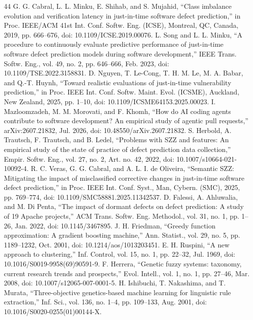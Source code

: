 \begin{thebibliography}{44}
 G. G. Cabral, L. L. Minku, E. Shihab, and S. Mujahid, ``Class imbalance evolution and verification latency in just-in-time software defect prediction,'' in Proc. IEEE/ACM 41st Int. Conf. Softw. Eng. (ICSE), Montreal, QC, Canada, 2019, pp. 666--676, doi: \mbox{10.1109/ICSE.2019.00076}.
 L. Song and L. L. Minku, ``A procedure to continuously evaluate predictive performance of just-in-time software defect prediction models during software development,'' IEEE Trans. Softw. Eng., vol. 49, no. 2, pp. 646--666, Feb. 2023, doi: \mbox{10.1109/TSE.2022.3158831}.
 D. Nguyen, T. Le-Cong, T. H. M. Le, M. A. Babar, and Q.-T. Huynh, ``Toward realistic evaluations of just-in-time vulnerability prediction,'' in Proc. IEEE Int. Conf. Softw. Maint. Evol. (ICSME), Auckland, New Zealand, 2025, pp. 1--10, doi: \mbox{10.1109/ICSME64153.2025.00023}.
 I. Mazloomzadeh, M. M. Morovati, and F. Khomh, ``How do AI coding agents contribute to software development? An empirical study of agentic pull requests,'' arXiv:2607.21832, Jul. 2026, doi: \mbox{10.48550/arXiv.2607.21832}.
 S. Herbold, A. Trautsch, F. Trautsch, and B. Ledel, ``Problems with SZZ and features: An empirical study of the state of practice of defect prediction data collection,'' Empir. Softw. Eng., vol. 27, no. 2, Art. no. 42, 2022, doi: \mbox{10.1007/s10664-021-10092-4}.
 R. C. Veras, G. G. Cabral, and A. L. I. de Oliveira, ``Semantic SZZ: Mitigating the impact of misclassified corrective changes in just-in-time software defect prediction,'' in Proc. IEEE Int. Conf. Syst., Man, Cybern. (SMC), 2025, pp. 769--774, doi: \mbox{10.1109/SMC58881.2025.11342537}.
 D. Falessi, A. Ahluwalia, and M. Di Penta, ``The impact of dormant defects on defect prediction: A study of 19 Apache projects,'' ACM Trans. Softw. Eng. Methodol., vol. 31, no. 1, pp. 1--26, Jan. 2022, doi: \mbox{10.1145/3467895}.
 J. H. Friedman, ``Greedy function approximation: A gradient boosting machine,'' Ann. Statist., vol. 29, no. 5, pp. 1189--1232, Oct. 2001, doi: \mbox{10.1214/aos/1013203451}.
 E. H. Ruspini, ``A new approach to clustering,'' Inf. Control, vol. 15, no. 1, pp. 22--32, Jul. 1969, doi: \mbox{10.1016/S0019-9958(69)90591-9}.
 F. Herrera, ``Genetic fuzzy systems: taxonomy, current research trends and prospects,'' Evol. Intell., vol. 1, no. 1, pp. 27--46, Mar. 2008, doi: \mbox{10.1007/s12065-007-0001-5}.
 H. Ishibuchi, T. Nakashima, and T. Murata, ``Three-objective genetics-based machine learning for linguistic rule extraction,'' Inf. Sci., vol. 136, no. 1--4, pp. 109--133, Aug. 2001, doi: \mbox{10.1016/S0020-0255(01)00144-X}.

\end{thebibliography}

